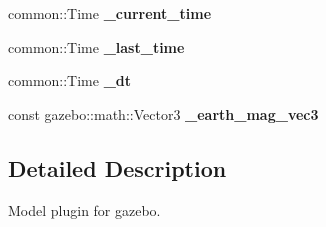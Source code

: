\begin{DoxyCompactItemize}
\item 
\hypertarget{classgazebo_1_1GazeboModelPlugin_ad2082ae8c6fb975117c23a4d2936303a}{common\-::\-Time {\bfseries \-\_\-current\-\_\-time}}\label{classgazebo_1_1GazeboModelPlugin_ad2082ae8c6fb975117c23a4d2936303a}

\item 
\hypertarget{classgazebo_1_1GazeboModelPlugin_abd8d95f8e053b4bd420cff88cd915426}{common\-::\-Time {\bfseries \-\_\-last\-\_\-time}}\label{classgazebo_1_1GazeboModelPlugin_abd8d95f8e053b4bd420cff88cd915426}

\item 
\hypertarget{classgazebo_1_1GazeboModelPlugin_a1a4f5eff9706be4cf260db754f0ec2ad}{common\-::\-Time {\bfseries \-\_\-dt}}\label{classgazebo_1_1GazeboModelPlugin_a1a4f5eff9706be4cf260db754f0ec2ad}

\item 
\hypertarget{classgazebo_1_1GazeboModelPlugin_a123f298e1e0e711f7e262f035e39cf70}{const gazebo\-::math\-::\-Vector3 {\bfseries \-\_\-earth\-\_\-mag\-\_\-vec3}}\label{classgazebo_1_1GazeboModelPlugin_a123f298e1e0e711f7e262f035e39cf70}

\end{DoxyCompactItemize}


\subsection{\-Detailed \-Description}
\-Model plugin for gazebo. 

